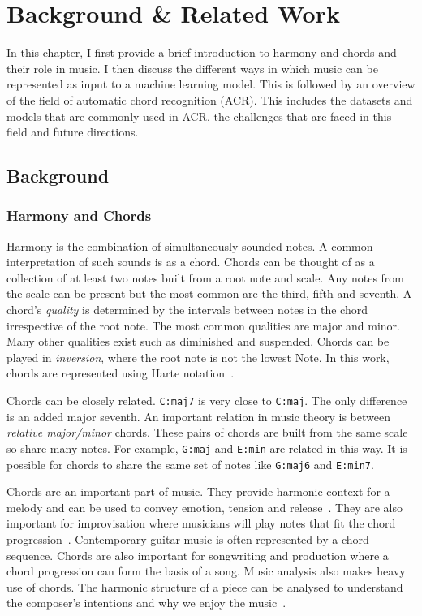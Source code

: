 \chapter{Background \& Related Work}

In this chapter, I first provide a brief introduction to harmony and chords and their role in music. I then discuss the different ways in which music can be represented as input to a machine learning model. This is followed by an overview of the field of automatic chord recognition (ACR). This includes the datasets and models that are commonly used in ACR, the challenges that are faced in this field and future directions.

\section{Background}

\subsection{Harmony and Chords}

Harmony is the combination of simultaneously sounded notes. A common interpretation of such sounds is as a chord. Chords can be thought of as a collection of at least two notes built from a root note and scale. Any notes from the scale can be present but the most common are the third, fifth and seventh. A chord's \emph{quality} is determined by the intervals between notes in the chord irrespective of the root note. The most common qualities are major and minor. Many other qualities exist such as diminished and suspended. Chords can be played in \emph{inversion}, where the root note is not the lowest Note. In this work, chords are represented using Harte notation~\citep{HarteNotation}.

Chords can be closely related. \texttt{C:maj7} is very close to \texttt{C:maj}. The only difference is an added major seventh. An important relation in music theory is between \emph{relative major/minor} chords. These pairs of chords are built from the same scale so share many notes. For example, \texttt{G:maj} and \texttt{E:min} are related in this way. It is possible for chords to share the same set of notes like \texttt{G:maj6} and \texttt{E:min7}.

Chords are an important part of music. They provide harmonic context for a melody and can be used to convey emotion, tension and release~\citep{HarmonyandVoiceLeading}. They are also important for improvisation where musicians will play notes that fit the chord progression~\citep{JazzTheoryBook}. Contemporary guitar music is often represented by a chord sequence. Chords are also important for songwriting and production where a chord progression can form the basis of a song. Music analysis also makes heavy use of chords. The harmonic structure of a piece can be analysed to understand the composer's intentions and why we enjoy the music~\citep{TonalAnalysisBach}.

